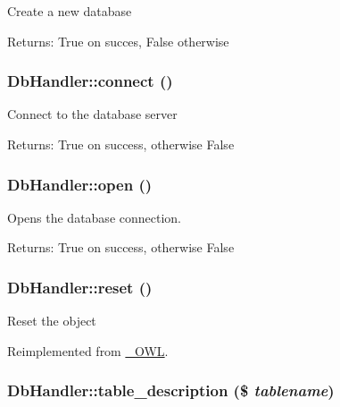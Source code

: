 Create a new database

\begin{Desc}
\item[Returns:]True on succes, False otherwise \end{Desc}
\hypertarget{classDbHandler_9cf52ba614981a0082063d57290d3b7c}{
\subsubsection{\setlength{\rightskip}{0pt plus 5cm}DbHandler::connect ()}}
\label{classDbHandler_9cf52ba614981a0082063d57290d3b7c}


Connect to the database server

\begin{Desc}
\item[Returns:]True on success, otherwise False \end{Desc}
\hypertarget{classDbHandler_fccbfc69ead84f8445116e050d1cfc2d}{
\subsubsection{\setlength{\rightskip}{0pt plus 5cm}DbHandler::open ()}}
\label{classDbHandler_fccbfc69ead84f8445116e050d1cfc2d}


Opens the database connection.

\begin{Desc}
\item[Returns:]True on success, otherwise False \end{Desc}
\hypertarget{classDbHandler_9982df4830f05803935bb31bac7fae3d}{
\subsubsection{\setlength{\rightskip}{0pt plus 5cm}DbHandler::reset ()}}
\label{classDbHandler_9982df4830f05803935bb31bac7fae3d}


Reset the object 

Reimplemented from \hyperlink{class__OWL_2f2a042bcf31965194c03033df0edc9b}{\_\-OWL}.\hypertarget{classDbHandler_f7fd704b72b00e315aafa08e47e90991}{
\subsubsection{\setlength{\rightskip}{0pt plus 5cm}DbHandler::table\_\-description (\$ {\em tablename})}}
\label{classDbHandler_f7fd704b72b00e315aafa08e47e90991}


